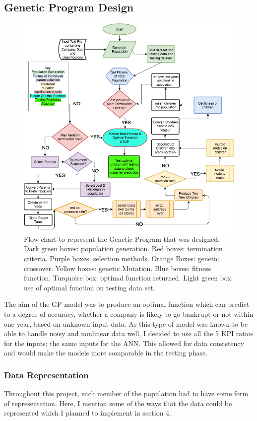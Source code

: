 \documentclass[11pt]{article}
\begin{document}
\subsection{Genetic Program Design}\label{subsec:gpDes}
\begin{figure}[h]
\centering
\includegraphics[scale = .55]{GPFlowReformat} 
\caption{Flow chart to represent the Genetic Program that was designed. Dark green boxes: population generation. Red boxes: termination criteria. Purple boxes: selection methods. Orange Boxes: genetic crossover. Yellow boxes: genetic Mutation. Blue boxes: fitness function. Turquoise box: optimal function returned. Light green box: use of optimal function on testing data set.} 
\end{figure}
The aim of the GP model was to produce an optimal function which can predict to a degree of accuracy, whether a company is likely to go bankrupt or not within one year, based on unknown input data. As this type of model was known to be able to handle noisy and nonlinear data well, I decided to use all the 5 KPI ratios for the inputs; the same inputs for the ANN. This allowed for data consistency and would make the models more comparable in the testing phase.
\subsubsection{Data Representation}\label{subsubsec:dataRep}
Throughout this project, each member of the population had to have some form of representation. Here, I mention some of the ways that the data could be represented which I planned to implement in section 4. 
\end{document}
